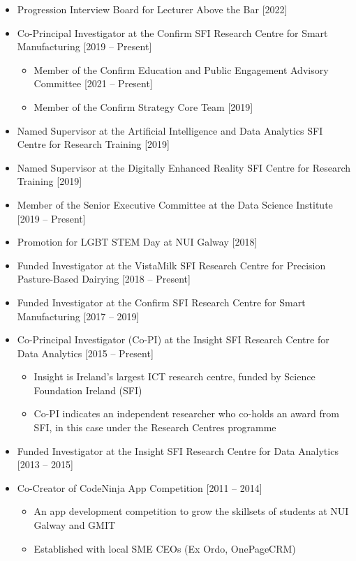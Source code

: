 \documentclass[10pt,a4paper]{res} %
\begin{document}
\begin{resume}
\begin{itemize} \itemsep -2pt
\item Progression Interview Board for Lecturer Above the Bar [2022]
\item Co-Principal Investigator at the Confirm SFI Research Centre for Smart Manufacturing [2019 -- Present]
\begin{itemize} \itemsep -2pt
\item Member of the Confirm Education and Public Engagement Advisory Committee [2021 -- Present]
\item Member of the Confirm Strategy Core Team [2019]
\end{itemize}
\item Named Supervisor at the Artificial Intelligence and Data Analytics SFI Centre for Research Training [2019]
\item Named Supervisor at the Digitally Enhanced Reality SFI Centre for Research Training [2019]
\item Member of the Senior Executive Committee at the Data Science Institute [2019 -- Present]
\item Promotion for LGBT STEM Day at NUI Galway [2018]
\item Funded Investigator at the VistaMilk SFI Research Centre for Precision Pasture-Based Dairying [2018 -- Present]
\item Funded Investigator at the Confirm SFI Research Centre for Smart Manufacturing [2017 -- 2019]
\item Co-Principal Investigator (Co-PI) at the Insight SFI Research Centre for Data Analytics [2015 -- Present]
\begin{itemize} \itemsep -2pt
\item Insight is Ireland's largest ICT research centre, funded by Science Foundation Ireland (SFI)
\item Co-PI indicates an independent researcher who co-holds an award from SFI, in this case under the Research Centres programme
\end{itemize}
\item Funded Investigator at the Insight SFI Research Centre for Data Analytics [2013 -- 2015]
\item Co-Creator of CodeNinja App Competition [2011 -- 2014]
\begin{itemize} \itemsep -2pt
\item An app development competition to grow the skillsets of students at NUI Galway and GMIT
\item Established with local SME CEOs (Ex Ordo, OnePageCRM)

\end{itemize}
\end{itemize}
\end{resume}
\end{document}
